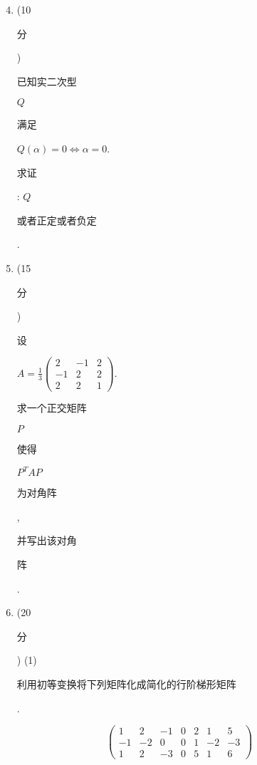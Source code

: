 \documentclass[10pt]{article}
\begin{document}
\begin{enumerate}
  \setcounter{enumi}{3}
  \item (10 \begin{CJK}{UTF8}{mj}分\end{CJK}) \begin{CJK}{UTF8}{mj}已知实二次型\end{CJK} $Q$ \begin{CJK}{UTF8}{mj}满足\end{CJK} $Q(\alpha)=0 \Leftrightarrow \alpha=0$. \begin{CJK}{UTF8}{mj}求证\end{CJK}: $Q$ \begin{CJK}{UTF8}{mj}或者正定或者负定\end{CJK}.

  \item (15 \begin{CJK}{UTF8}{mj}分\end{CJK}) \begin{CJK}{UTF8}{mj}设\end{CJK} $A=\frac{1}{3}\left(\begin{array}{ccc}2 & -1 & 2 \\ -1 & 2 & 2 \\ 2 & 2 & 1\end{array}\right)$. \begin{CJK}{UTF8}{mj}求一个正交矩阵\end{CJK} $P$ \begin{CJK}{UTF8}{mj}使得\end{CJK} $P^{T} A P$ \begin{CJK}{UTF8}{mj}为对角阵\end{CJK}, \begin{CJK}{UTF8}{mj}并写出该对角\end{CJK} \begin{CJK}{UTF8}{mj}阵\end{CJK}.

  \item (20 \begin{CJK}{UTF8}{mj}分\end{CJK}) (1) \begin{CJK}{UTF8}{mj}利用初等变换将下列矩阵化成简化的行阶梯形矩阵\end{CJK}.

\end{enumerate}
$$
\left(\begin{array}{ccccccc}
1 & 2 & -1 & 0 & 2 & 1 & 5 \\
-1 & -2 & 0 & 0 & 1 & -2 & -3 \\
1 & 2 & -3 & 0 & 5 & 1 & 6
\end{array}\right)
$$
\end{document}
